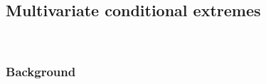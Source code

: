 \documentclass[12pt]{article}
\begin{document}
\subsection{Multivariate conditional extremes}~\label{subsec:ce_model}
\vspace{-1.5\baselineskip} %
\subsubsection{Background}~\label{subsubsec:ce_background}
\vspace{-1.5\baselineskip} %

\end{document}

